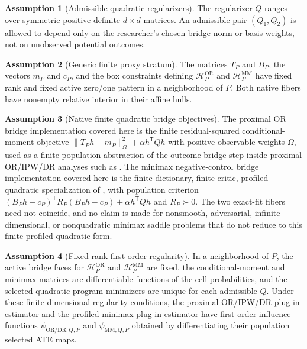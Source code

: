 \documentclass[11pt]{article}
\newcommand{\transpose}{\mathsf{T}}
\newcommand{\calH}{\mathcal{H}}
\theoremstyle{definition}
\newtheorem{assumption}{Assumption}
\theoremstyle{plain}
\theoremstyle{remark}
\begin{document}
\begin{assumption}[Admissible quadratic regularizers]\label{ass:admissible-Q}
The regularizer \(Q\) ranges over symmetric positive-definite \(d\times d\)
matrices.  An admissible pair \((Q_1,Q_2)\) is allowed to depend only on the
researcher's chosen bridge norm or basis weights, not on unobserved potential
outcomes.
\end{assumption}

\begin{assumption}[Generic finite proxy stratum]\label{ass:generic-stratum}
The matrices \(T_P\) and \(B_P\), the vectors \(m_P\) and \(c_P\), and the
box constraints defining \(\calH_P^{\mathrm{OR}}\) and
\(\calH_P^{\mathrm{MM}}\) have fixed rank and fixed active zero/one pattern
in a neighborhood of \(P\).  Both native fibers have nonempty relative
interior in their affine hulls.
\end{assumption}

\begin{assumption}[Native finite quadratic bridge objectives]\label{ass:native-workflow}
The proximal OR bridge implementation covered here is the finite
residual-squared conditional-moment objective
\(\|T_Ph-m_P\|_\Omega^2+\alpha h^\transpose Qh\) with positive observable
weights \(\Omega\), used as a finite population abstraction of the outcome
bridge step inside proximal OR/IPW/DR analyses such as
\citet{CuiPuShiMiaoTchetgen2024JASA}.  The minimax negative-control bridge
implementation covered here is the finite-dictionary, finite-critic,
profiled quadratic specialization of \citet{KallusMaoUehara2021MinimaxNC},
with population criterion
\((B_Ph-c_P)^\transpose R_P(B_Ph-c_P)+\alpha h^\transpose Qh\) and
\(R_P\succ0\).  The two exact-fit fibers need not coincide, and no claim is
made for nonsmooth, adversarial, infinite-dimensional, or nonquadratic
minimax saddle problems that do not reduce to this finite profiled quadratic
form.
\end{assumption}

\begin{assumption}[Fixed-rank first-order regularity]\label{ass:regularity}
In a neighborhood of \(P\), the active bridge faces for
\(\calH_P^{\mathrm{OR}}\) and \(\calH_P^{\mathrm{MM}}\) are fixed, the
conditional-moment and minimax matrices are differentiable functions of the
cell probabilities, and the selected quadratic-program minimizers are unique
for each admissible \(Q\).  Under these finite-dimensional regularity
conditions, the proximal OR/IPW/DR plug-in estimator and the profiled minimax
plug-in estimator have first-order influence functions
\(\psi_{\mathrm{OR/DR},Q,P}\) and \(\psi_{\mathrm{MM},Q,P}\) obtained by
differentiating their population selected ATE maps.
\end{assumption}
\end{document}
